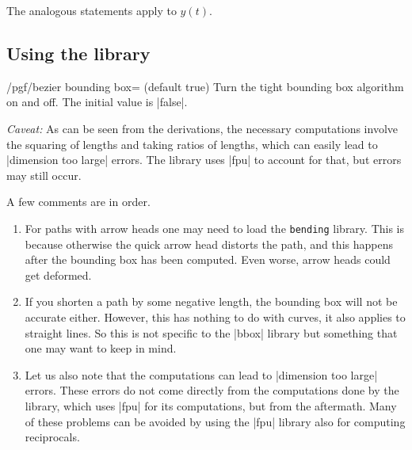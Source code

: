The analogous statements apply to $y(t)$. 

\subsection{Using the library}

\begin{key}{/pgf/bezier bounding box= (default true)}
    Turn the tight bounding box algorithm on and off. The initial value is
	|false|.

	\emph{Caveat:} As can be seen from the derivations, the necessary
	computations involve the squaring of lengths and taking ratios of lengths,
	which can easily lead to |dimension too large| errors. The library uses
	|fpu| to account for that, but errors may still occur.
\end{key}


\begin{codeexample}[width=5cm]
\end{codeexample}

A few comments are in order. 
\begin{enumerate}
\item For paths with arrow heads one may need to load the
 \texttt{bending} library. This is because otherwise the quick arrow head
 distorts the path, and this happens after the bounding box has been computed.
 Even worse, arrow heads could get deformed.
\item If you shorten a path by some negative length, the bounding box will not
 be accurate either. However, this has nothing to do with curves, it also
 applies to straight lines. So this is not specific to the |bbox| library but
 something that one may want to keep in mind.
\item Let us also note that the computations can lead to |dimension too large| errors.
 These errors do not come directly from the computations done by the library,
 which uses |fpu| for its computations, but from the aftermath. Many of these
 problems can be avoided by using the |fpu| library also for computing
 reciprocals. 
\end{enumerate}

\endinput


